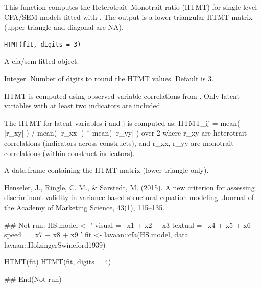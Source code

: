 \documentclass[a4paper]{book}
\begin{document}
%
\begin{Description}
This function computes the Heterotrait–Monotrait ratio (HTMT)
for single-level CFA/SEM models fitted with .
The output is a lower-triangular HTMT matrix (upper triangle and diagonal are NA).
\end{Description}
%
\begin{Usage}
\begin{verbatim}
HTMT(fit, digits = 3)
\end{verbatim}
\end{Usage}
%
\begin{Arguments}
\begin{ldescription}
\item[\code{fit}] A  cfa/sem fitted object.

\item[\code{digits}] Integer. Number of digits to round the HTMT values. Default is 3.
\end{ldescription}
\end{Arguments}
%
\begin{Details}
HTMT is computed using observed-variable correlations from
.
Only latent variables with at least two indicators are included.

The HTMT for latent variables i and j is computed as:
HTMT\_ij = mean( |r\_xy| ) /  mean( |r\_xx| ) * mean( |r\_yy| )  over 2
where r\_xy are heterotrait correlations (indicators across constructs),
and r\_xx, r\_yy are monotrait correlations (within-construct indicators).
\end{Details}
%
\begin{Value}
A data.frame containing the HTMT matrix (lower triangle only).
\end{Value}
%
\begin{References}
Henseler, J., Ringle, C. M., \& Sarstedt, M. (2015).
A new criterion for assessing discriminant validity in variance-based
structural equation modeling. Journal of the Academy of Marketing Science,
43(1), 115–135.
\end{References}
%
\begin{Examples}
\begin{ExampleCode}
\#\# Not run: 
HS.model <- '
  visual  =~ x1 + x2 + x3
  textual =~ x4 + x5 + x6
  speed   =~ x7 + x8 + x9
'
fit <- lavaan::cfa(HS.model, data = lavaan::HolzingerSwineford1939)

HTMT(fit)
HTMT(fit, digits = 4)

## End(Not run)
\end{ExampleCode}
\end{Examples}
\end{document}
